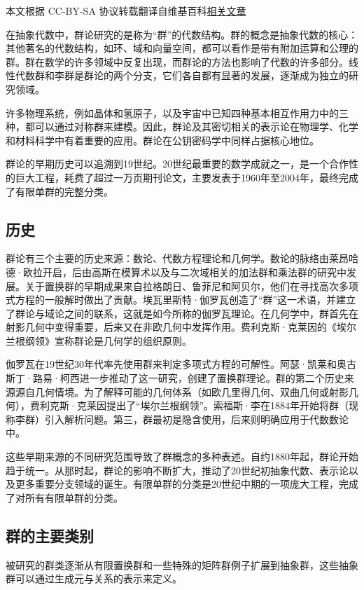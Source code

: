 
本文根据 CC-BY-SA 协议转载翻译自维基百科\href{https://en.wikipedia.org/wiki/Group_theory}{相关文章}

在抽象代数中，群论研究的是称为“群”的代数结构。群的概念是抽象代数的核心：其他著名的代数结构，如环、域和向量空间，都可以看作是带有附加运算和公理的群。群在数学的许多领域中反复出现，而群论的方法也影响了代数的许多部分。线性代数群和李群是群论的两个分支，它们各自都有显著的发展，逐渐成为独立的研究领域。

许多物理系统，例如晶体和氢原子，以及宇宙中已知四种基本相互作用力中的三种，都可以通过对称群来建模。因此，群论及其密切相关的表示论在物理学、化学和材料科学中有着重要的应用。群论在公钥密码学中同样占据核心地位。

群论的早期历史可以追溯到19世纪。20世纪最重要的数学成就之一，是一个合作性的巨大工程，耗费了超过一万页期刊论文，主要发表于1960年至2004年，最终完成了有限单群的完整分类。
\subsection{历史}
群论有三个主要的历史来源：数论、代数方程理论和几何学。数论的脉络由莱昂哈德·欧拉开启，后由高斯在模算术以及与二次域相关的加法群和乘法群的研究中发展。关于置换群的早期成果来自拉格朗日、鲁菲尼和阿贝尔，他们在寻找高次多项式方程的一般解时做出了贡献。埃瓦里斯特·伽罗瓦创造了“群”这一术语，并建立了群论与域论之间的联系，这就是如今所称的伽罗瓦理论。在几何学中，群首先在射影几何中变得重要，后来又在非欧几何中发挥作用。费利克斯·克莱因的《埃尔兰根纲领》宣称群论是几何学的组织原则。

伽罗瓦在19世纪30年代率先使用群来判定多项式方程的可解性。阿瑟·凯莱和奥古斯丁·路易·柯西进一步推动了这一研究，创建了置换群理论。群的第二个历史来源源自几何情境。为了解释可能的几何体系（如欧几里得几何、双曲几何或射影几何），费利克斯·克莱因提出了“埃尔兰根纲领”。索福斯·李在1884年开始将群（现称李群）引入解析问题。第三，群最初是隐含使用，后来则明确应用于代数数论中。

这些早期来源的不同研究范围导致了群概念的多种表述。自约1880年起，群论开始趋于统一。从那时起，群论的影响不断扩大，推动了20世纪初抽象代数、表示论以及更多重要分支领域的诞生。有限单群的分类是20世纪中期的一项庞大工程，完成了对所有有限单群的分类。
\subsection{群的主要类别}
被研究的群类逐渐从有限置换群和一些特殊的矩阵群例子扩展到抽象群，这些抽象群可以通过生成元与关系的表示来定义。
